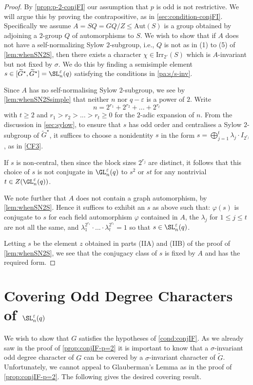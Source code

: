 \documentclass[eqthmnum, nocolour]{jt-calcs}
\newcommand{\aut}{\mathrm{Aut}}
\newcommand{\irr}{\mathrm{Irr}}
\newcommand{\wt}[1]{\widetilde{#1}}
\renewcommand{\epsilon}{\varepsilon}
\begin{document}
\begin{proof}
By \cref{prop:p-2-conjFI} our assumption that $p$ is odd is not restrictive. We will argue this by proving the contrapositive, as in \cref{sec:condition-conjFI}. Specifically we assume $A = SQ = GQ/Z \leq\aut(S)$ is a group obtained by adjoining a $2$-group $Q$ of automorphisms to $S$. We wish to show that if $A$ does not have a self-normalizing Sylow $2$-subgroup, i.e., $Q$ is not as in (1) to (5) of \cref{lem:whenSN2S}, then there exists a character $\chi\in\irr_{2'}(S)$ which is $A$-invariant but not fixed by $\sigma$. We do this by finding a semisimple element $s \in [\widetilde{G}^{\star},\widetilde{G}^{\star}] = \SL_n^{\varepsilon}(q)$ satisfying the conditions in \cref{pa:s/s-inv}.

Since $A$ has no self-normalising Sylow $2$-subgroup, we see by \cref{lem:whenSN2Ssimple} that neither $n$ nor $q-\epsilon$ is a power of $2$.  Write
\begin{equation*}
n=2^{r_1}+2^{r_2}+...+2^{r_t}
\end{equation*}
with $t\geq 2$ and $r_1>r_2>...>r_t\geq 0$ for the $2$-adic expansion of $n$.  From the discussion in \cref{sec:sylow}, to ensure that $s$ has odd order and centralises a Sylow $2$-subgroup of $\wt{G}^\star$, it suffices to choose a nonidentity $s$ in the form $s=\bigoplus_{j=1}^t \lambda_j\cdot I_{2^{r_j}}$, as in \eqref{CF3}.

If $s$ is non-central, then since the block sizes $2^{r_j}$ are distinct, it follows that this choice of $s$ is not conjugate in $\GL_n^\epsilon(q)$ to $s^2$ or $st$ for any nontrivial $t\in Z(\GL_n^\epsilon(q))$.

We note further that $A$ does not contain a graph automorphism, by \cref{lem:whenSN2S}.  Hence it suffices to exhibit an $s$ as above such that: $\varphi(s)$ is conjugate to $s$ for each field automorphism $\varphi$ contained in $A$, the $\lambda_j$ for $1\leq j\leq t$ are not all the same, and $\lambda_1^{2^{r_1}}\cdot...\cdot\lambda_t^{2^{r_t}}=1$ so that $s\in \SL_n^\epsilon(q)$. 

Letting $s$ be the element $z$ obtained in parts (IIA) and (IIB) of the proof of \cref{lem:whenSN2S}, we see that the conjugacy class of $s$ is fixed by $A$ and has the required form.
\end{proof}

\section{Covering Odd Degree Characters of $\SL_n^{\varepsilon}(q)$}
\begin{pa}
We wish to show that $G$ satisfies the hypotheses of \cref{cond:conjIF}. As we already saw in the proof of \cref{prop:conjIF-p=2} it is important to know that a $\sigma$-invariant odd degree character of $G$ can be covered by a $\sigma$-invariant character of $\widetilde{G}$. Unfortunately, we cannot appeal to Glauberman's Lemma as in the proof of \cref{prop:conjIF-p=2}. The following gives the desired covering result.
\end{pa}
\end{document}
